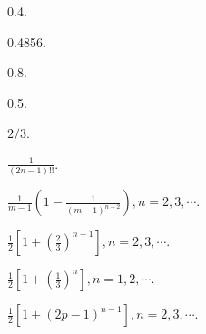 \begin{answer}

  \item \begin{enumerate*}
    \item 0.4.
    \item 0.4856.
  \end{enumerate*}

  \item \begin{enumerate*}
    \item 0.8.
    \item 0.5.
  \end{enumerate*}

  \item $2/3$.

  \item $\frac1{(2n-1)!!}$.

  \item $\frac1{m-1}\left(1-\frac1{(m-1)^{n-2}}\right),n=2,3,\cdots$.

  \item $\frac12\left[1+\left(\frac23\right)^{n-1}\right],
  n=2,3,\cdots$.

  \item $\frac12\left[1+\left(\frac13\right)^n\right],
  n=1,2,\cdots$.

  \item $\frac12[1+(2p-1)^{n-1}],n=2,3,\cdots$.
\end{answer}


